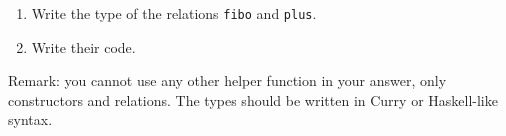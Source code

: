 \documentclass{article}
\newcommand{\answer}[1]{}
\begin{document}
\begin{enumerate}
\item Write the type of the relations \texttt{fibo} and
  \texttt{plus}. 
\item Write their code. 
\end{enumerate}

Remark: you cannot use any other helper function in your answer, only
constructors and relations. The types should be written in Curry or
Haskell-like syntax.

\answer{
\begin{verbatim}
    fibo :: Nat -> Nat -> Success
    fibo Zero Zero = success
    fibo (Suc Zero) (Suc Zero) = success
    fibo (Suc (Suc n)) m = fibo (Suc n) a &
                           fibo n b &
                           plus a b m
      where a b free

    plus :: Nat -> Nat -> Nat -> Success
    plus Zero m n = m =:= n
    plus (Suc m) n (Suc p) = plus m n p
  \end{verbatim}
}
\end{document}
